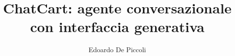 \newcommand{\TitoloTesi}{ChatCart: agente conversazionale con interfaccia generativa}
\newcommand{\AutoreTesi}{Edoardo De Piccoli}
\newcommand{\Matricola}{2101055}
\newcommand{\Relatore}{Prof.\ Tullio Vardanega}
\newcommand{\AnnoAccademico}{2025-2026}

\title{\TitoloTesi}
\author{\AutoreTesi}
\date{}
